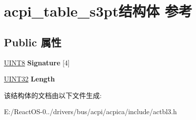 \hypertarget{structacpi__table__s3pt}{}\section{acpi\+\_\+table\+\_\+s3pt结构体 参考}
\label{structacpi__table__s3pt}
\subsection*{Public 属性}
\begin{DoxyCompactItemize}
\item 
\mbox{\label{structacpi__table__s3pt_af3bf67db75b6eacefef451166ec7d359}} 
\hyperlink{_processor_bind_8h_ab27e9918b538ce9d8ca692479b375b6a}{U\+I\+N\+T8} {\bfseries Signature} \mbox{[}4\mbox{]}
\item 
\mbox{\label{structacpi__table__s3pt_a325721c6aefb0ea09a027b0a41575de2}} 
\hyperlink{_processor_bind_8h_ae1e6edbbc26d6fbc71a90190d0266018}{U\+I\+N\+T32} {\bfseries Length}
\end{DoxyCompactItemize}


该结构体的文档由以下文件生成\+:\begin{DoxyCompactItemize}
\item 
E\+:/\+React\+O\+S-\/0../drivers/bus/acpi/acpica/include/actbl3.\+h\end{DoxyCompactItemize}
